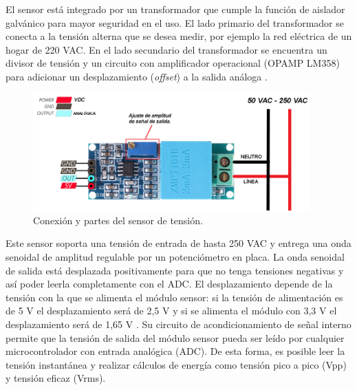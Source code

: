 El sensor está integrado por un transformador que cumple la función de aislador galvánico para mayor seguridad en el uso. El lado primario del transformador se conecta a la tensión alterna que se desea medir, por ejemplo la red eléctrica de un hogar de 220 VAC. En el lado secundario del transformador se encuentra un divisor de tensión y un circuito con amplificador operacional (OPAMP LM358) para adicionar un desplazamiento (\emph{offset}) a la salida análoga \citep{WEBSITE:22}. 

\begin{figure}[htpb]
\centering 
\includegraphics[width=0.95\textwidth]{./Figures/sensortension.png}
\caption{Conexión y partes del sensor de tensión.}
\label{fig:sensortension}
\end{figure}


Este sensor soporta una tensión de entrada de hasta 250 VAC y entrega una onda senoidal de amplitud regulable por un potenciómetro en placa. La onda senoidal de salida está desplazada positivamente para que no tenga tensiones negativas y así poder leerla completamente con el ADC. El desplazamiento depende de la tensión con la que se alimenta el módulo sensor: si la tensión de alimentación es de 5 V el desplazamiento será de 2,5 V y si se alimenta el módulo con 3,3 V el desplazamiento será de 1,65 V \citep{WEBSITE:23}. Su circuito de acondicionamiento de señal interno permite que la tensión de salida del módulo sensor pueda ser leído por cualquier microcontrolador con entrada analógica (ADC). De esta forma, es posible leer la tensión instantánea y realizar cálculos de energía como tensión pico a pico (Vpp) y tensión eficaz (Vrms). 




